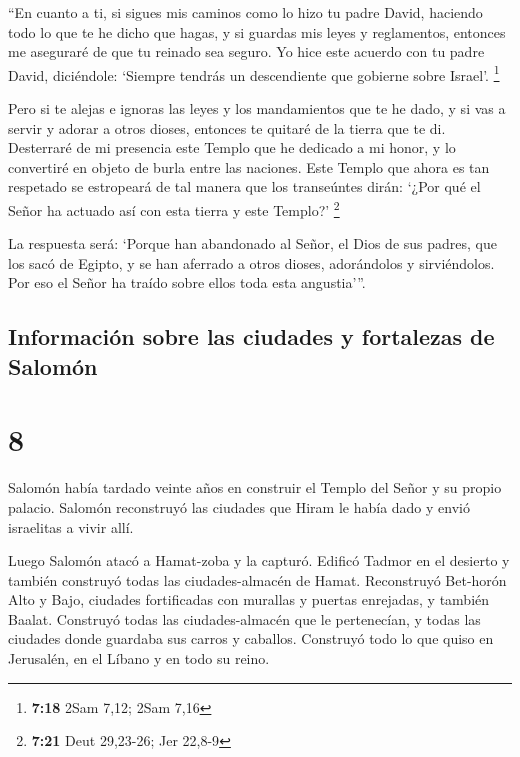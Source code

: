  ``En cuanto a ti, si sigues mis caminos como lo hizo tu
padre David, haciendo todo lo que te he dicho que hagas, y si guardas
mis leyes y reglamentos,  entonces me aseguraré de que tu
reinado sea seguro. Yo hice este acuerdo con tu padre David, diciéndole:
`Siempre tendrás un descendiente que gobierne sobre Israel'. \footnote{\textbf{7:18}
  2Sam 7,12; 2Sam 7,16}

 Pero si te alejas e ignoras las leyes y los mandamientos
que te he dado, y si vas a servir y adorar a otros dioses,
 entonces te quitaré de la tierra que te di. Desterraré
de mi presencia este Templo que he dedicado a mi honor, y lo convertiré
en objeto de burla entre las naciones.  Este Templo que
ahora es tan respetado se estropeará de tal manera que los transeúntes
dirán: `¿Por qué el Señor ha actuado así con esta tierra y este Templo?'
\footnote{\textbf{7:21} Deut 29,23-26; Jer 22,8-9}

 La respuesta será: `Porque han abandonado al Señor, el
Dios de sus padres, que los sacó de Egipto, y se han aferrado a otros
dioses, adorándolos y sirviéndolos. Por eso el Señor ha traído sobre
ellos toda esta angustia'''.

\hypertarget{informaciuxf3n-sobre-las-ciudades-y-fortalezas-de-salomuxf3n}{%
\subsection{Información sobre las ciudades y fortalezas de
Salomón}\label{informaciuxf3n-sobre-las-ciudades-y-fortalezas-de-salomuxf3n}}

\hypertarget{section-7}{%
\section{8}\label{section-7}}

 Salomón había tardado veinte años en construir el Templo
del Señor y su propio palacio.  Salomón reconstruyó las
ciudades que Hiram le había dado y envió israelitas a vivir allí.

 Luego Salomón atacó a Hamat-zoba y la capturó.
 Edificó Tadmor en el desierto y también construyó todas
las ciudades-almacén de Hamat.  Reconstruyó Bet-horón Alto
y Bajo, ciudades fortificadas con murallas y puertas enrejadas,
 y también Baalat. Construyó todas las ciudades-almacén
que le pertenecían, y todas las ciudades donde guardaba sus carros y
caballos. Construyó todo lo que quiso en Jerusalén, en el Líbano y en
todo su reino.


